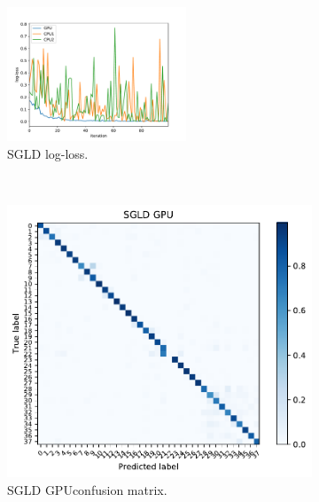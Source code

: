 \documentclass[conference]{IEEEtran}
\begin{document}
\begin{figure}
	\centering
	\begin{subfigure}[b]{0.3\textwidth}
		\includegraphics[width=\textwidth,height=4cm]{results/sgld_losloss}
		\caption{SGLD log-loss.}
		\label{fig:sgld_cpu_gpu}
	\end{subfigure}
	~ %
	\begin{subfigure}[b]{0.2\textwidth}
		\includegraphics[width=\textwidth]{results/plants_confusion_matrix_sgld_gpu}
		\caption{SGLD GPUconfusion matrix.}
		\label{fig:sgld_gpu_performance}
	\end{subfigure}
	~ %
	\begin{subfigure}[b]{0.2\textwidth}

\end{subfigure}
\end{figure}
\end{document}

